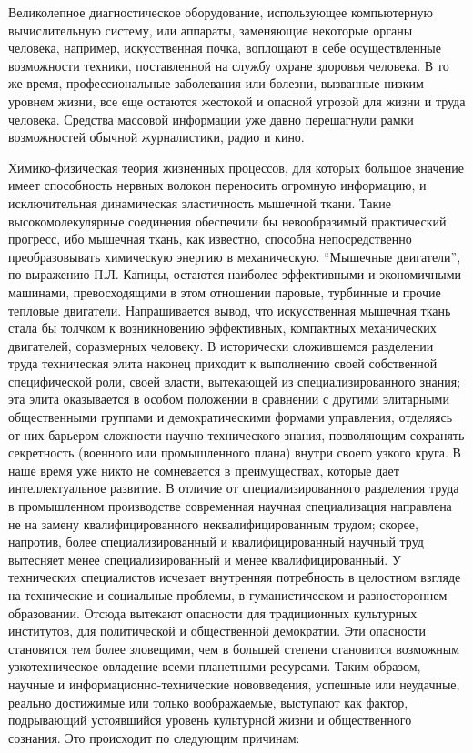 Великолепное диагностическое оборудование, использующее компьютерную вычислительную систему, или аппараты, заменяющие некоторые органы человека, например, искусственная почка, воплощают в себе осуществленные возможности техники, поставленной на службу охране здоровья человека. В то же время, профессиональные заболевания или болезни, вызванные низким уровнем жизни, все еще остаются жестокой и опасной угрозой для жизни и труда человека.  Средства массовой информации уже давно перешагнули рамки возможностей обычной журналистики, радио и кино.

Химико-физическая теория жизненных процессов, для которых большое значение имеет способность нервных волокон переносить огромную информацию, и исключительная динамическая эластичность мышечной ткани. Такие высокомолекулярные соединения обеспечили бы невообразимый практический прогресс, ибо мышечная ткань, как известно, способна непосредственно преобразовывать химическую энергию в механическую. ``Мышечные двигатели'', по выражению П.Л. Капицы, остаются наиболее эффективными и экономичными машинами, превосходящими в этом отношении паровые, турбинные и прочие тепловые двигатели. Напрашивается вывод, что искусственная мышечная ткань стала бы толчком к возникновению эффективных, компактных механических двигателей, соразмерных человеку.  В исторически сложившемся разделении труда техническая элита наконец приходит к выполнению своей собственной специфической роли, своей власти, вытекающей из специализированного знания; эта элита оказывается в особом положении в сравнении с другими элитарными общественными группами и демократическими формами управления, отделяясь от них барьером сложности научно-технического знания, позволяющим сохранять секретность (военного или промышленного плана) внутри своего узкого круга. В наше время уже никто не сомневается в преимуществах, которые дает интеллектуальное развитие. В отличие от специализированного разделения труда в промышленном производстве современная научная специализация направлена не на замену квалифицированного неквалифицированным трудом; скорее, напротив, более специализированный и квалифицированный научный труд вытесняет менее специализированный и менее квалифицированный. У технических специалистов исчезает внутренняя потребность в целостном взгляде на технические и социальные проблемы, в гуманистическом и разностороннем образовании. Отсюда вытекают опасности для традиционных культурных институтов, для политической и общественной демократии. Эти опасности становятся тем более зловещими, чем в большей степени становится возможным узкотехническое овладение всеми планетными ресурсами.  Таким образом, научные и информационно-технические нововведения, успешные или неудачные, реально достижимые или только воображаемые, выступают как фактор, подрывающий устоявшийся уровень культурной жизни и общественного сознания. Это происходит по следующим причинам:

